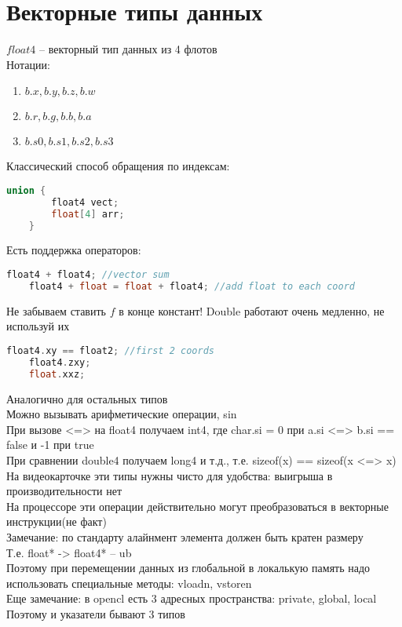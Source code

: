 \documentclass[12pt]{article}
\begin{document}
\section{Векторные типы данных}
$float4$ -- векторный тип данных из 4 флотов\\
Нотации: \begin{enumerate}
    \item $b.x, b.y, b.z, b.w$
    \item $b.r, b.g, b.b, b.a$
    \item $b.s0, b.s1, b.s2, b.s3$
\end{enumerate}
Классический способ обращения по индексам:
\begin{lstlisting}[language=c]
    union {
        float4 vect;
        float[4] arr;
    }
\end{lstlisting}
Есть поддержка операторов:
\begin{lstlisting}[language=c]
    float4 + float4; //vector sum
    float4 + float = float + float4; //add float to each coord
\end{lstlisting}
Не забываем ставить $f$ в конце констант! Double работают очень медленно, не используй их\\
\begin{lstlisting}[language=c]
    float4.xy == float2; //first 2 coords
    float4.zxy;
    float.xxz;
\end{lstlisting}
Аналогично для остальных типов\\
Можно вызывать арифметические операции, sin\\
При вызове <=> на float4 получаем int4, где char.si = 0 при a.si <=> b.si == false и -1 при true\\
При сравнении double4 получаем long4 и т.д., т.е. sizeof(x) == sizeof(x <=> x)\\
На видеокарточке эти типы нужны чисто для удобства: выигрыша в производительности нет\\
На процессоре эти операции действительно могут преобразоваться в векторные инструкции(не факт)\\
Замечание: по стандарту алайнмент элемента должен быть кратен размеру\\
Т.е. float* -> float4* -- ub\\
Поэтому при перемещении данных из глобальной в локалькую память надо использовать специальные методы: vloadn, vstoren\\

Еще замечание: в opencl есть 3 адресных пространства: private, global, local\\
Поэтому и указатели бывают 3 типов\\
\end{document}
